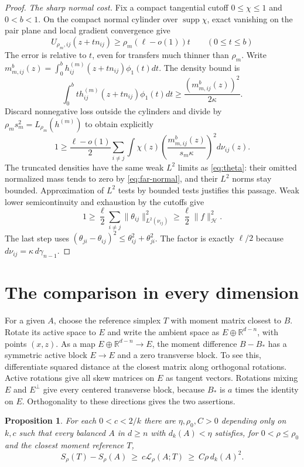 \documentclass[11pt,reqno]{amsart}
\newtheorem{proposition}[theorem]{Proposition}
\newcommand{\R}{\mathbb R}
\newcommand{\norm}[1]{\lVert #1\rVert}
\newcommand{\ga}{\gamma}
\newcommand{\LL}{\mathcal L}
\newcommand{\HH}{\mathcal H}
\begin{document}
\begin{proof}
\smallskip\noindent\emph{The sharp normal cost.}
Fix a compact tangential cutoff $0\le\chi\le1$ and $0<b<1$.
On the compact normal cylinder over $\operatorname{supp}\chi$,
exact vanishing on the pair plane and local gradient convergence give
\[
 U_{\rho_m,ij}(z+tn_{ij})\ge\rho_m(\ell-o(1))t
 \qquad(0\le t\le b)
\]
The error is relative to $t$, even for transfers much thinner than
$\rho_m$. Write
$m_{m,ij}^b(z)=\int_0^b h_{ij}^{(m)}(z+tn_{ij})\phi_1(t)dt$.
The density bound is
\[
 \int_0^b t h_{ij}^{(m)}(z+tn_{ij})\phi_1(t)dt
       \ge\frac{(m_{m,ij}^b(z))^2}{2\kappa}.
\]
Discard nonnegative loss outside the cylinders and divide by
$\rho_ms_m^2=L_{\rho_m}(h^{(m)})$ to obtain explicitly
\[
 1\ge\frac{\ell-o(1)}2\sum_{i\ne j}
       \int\chi(z)\left(\frac{m_{m,ij}^b(z)}{s_m\kappa}\right)^2d\nu_{ij}(z).
\]
The truncated densities have the same weak $L^2$ limits as
\eqref{eq:theta}: their omitted normalized mass tends to zero by
\eqref{eq:far-normal}, and their $L^2$ norms stay bounded.
Approximation of $L^2$ tests by bounded tests justifies this passage.
Weak lower semicontinuity and exhaustion by the cutoffs give
\begin{equation}\label{eq:ordered-liminf}
 1\ge\frac\ell2\sum_{i\ne j}\norm{\theta_{ij}}_{L^2(\nu_{ij})}^2
       \ge\frac\ell2\norm f_\HH^2.
\end{equation}
The last step uses $(\theta_{ji}-\theta_{ij})^2\le
\theta_{ij}^2+\theta_{ji}^2$. The factor is exactly $\ell/2$ because
$d\nu_{ij}=\kappa\,d\ga_{n-1}$.
\end{proof}

\section{The comparison in every dimension}\label{sec:comparison}

For a given $A$, choose the reference simplex $T$ with moment matrix
closest to $B$. Rotate its active space to $E$ and write the ambient
space as $E\oplus\R^{d-n}$, with points $(x,z)$. As a map
$E\oplus\R^{d-n}\to E$, the moment difference $B-B_*$ has a symmetric
active block $E\to E$ and a zero transverse block. To see this,
differentiate squared distance at the closest matrix along orthogonal
rotations. Active rotations give all skew matrices on $E$ as tangent
vectors. Rotations mixing $E$ and $E^\perp$ give every centered
transverse block, because $B_*$ is $a$ times the identity on $E$.
Orthogonality to these directions gives the two assertions.

\begin{proposition}\label{prop:local}
For each $0<c<2/k$ there are $\eta,\rho_0,C>0$ depending only on $k,c$
such that every balanced $A$ in $d\ge n$ with $d_k(A)<\eta$ satisfies,
for $0<\rho\le\rho_0$ and the closest moment reference $T$,
\[
 S_\rho(T)-S_\rho(A)\ \ge\ c\LL_\rho(A;T)\
                         \ge\ C\rho\,d_k(A)^2.
\]
\end{proposition}
\end{document}
